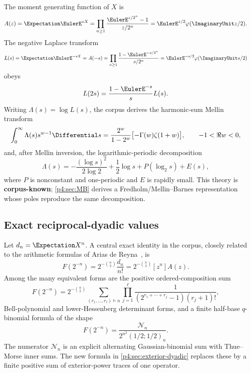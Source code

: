 \documentclass[11pt]{article}
\theoremstyle{definition}
\theoremstyle{remark}
\newcommand{\phiF}{\varphi}
\newcommand{\CorpusKnown}{\textcolor{linkblue}{\textbf{corpus-known}}}
\begin{document}
The moment generating function of \(X\) is
\begin{equation}
 A(z)=\Expectation\EulerE^{zX}
 =\prod_{n\ge1}\frac{\EulerE^{z/2^n}-1}{z/2^n}
 =\EulerE^{z/2}\phiF(\ImaginaryUnit z/2).
 \label{p4:eq:A-product}
\end{equation}
The negative Laplace transform
\begin{equation}
 L(s)=\Expectation\EulerE^{-sX}=A(-s)
 =\prod_{n\ge1}\frac{1-\EulerE^{-s/2^n}}{s/2^n}
 =\EulerE^{-s/2}\phiF(\ImaginaryUnit s/2)
 \label{p4:eq:L-product}
\end{equation}
obeys
\begin{equation}
 L(2s)=\frac{1-\EulerE^{-s}}{s}L(s).
 \label{p4:eq:L-scaling}
\end{equation}
Writing \(\Lambda(s)=\log L(s)\), the corpus derives the harmonic-sum Mellin transform
\begin{equation}
 \int_0^\infty \Lambda(s)s^{w-1}\Differential s
 =\frac{2^w}{1-2^w}\bigl[-\Gamma(w)\zeta(1+w)\bigr],
 \qquad -1<\Re w<0,
 \label{p4:eq:known-Mellin}
\end{equation}
and, after Mellin inversion, the logarithmic-periodic decomposition
\begin{equation}
 \Lambda(s)=-\frac{(\log s)^2}{2\log2}+\frac12\log s
 +P(\log_2s)+E(s),
 \label{p4:eq:endpoint-periodic}
\end{equation}
where \(P\) is nonconstant and one-periodic and \(E\) is rapidly small.  This theory is
\CorpusKnown{}; \cref{p4:sec:MB} derives a Fredholm/Mellin--Barnes representation whose
poles reproduce the same decomposition.

\subsection{Exact reciprocal-dyadic values}

Let \(d_n=\Expectation X^n\).  A central exact identity in the corpus, closely related to the arithmetic formulas of
Arias de Reyna~\cite{p4:Arias2018}, is
\begin{equation}
 \boxed{\quad
 F(2^{-n})=2^{-\binom n2}\frac{d_n}{n!}
 =2^{-\binom n2}[z^n]A(z).
 \quad}
 \label{p4:eq:dyadic-moment}
\end{equation}
Among the many equivalent forms are the positive ordered-composition sum
\begin{equation}
 F(2^{-n})=2^{-\binom n2}
 \sum_{(r_1,\ldots,r_\ell)\vDash n}
 \prod_{j=1}^{\ell}
 \frac1{(2^{r_1+\cdots+r_j}-1)(r_j+1)!},
 \label{p4:eq:ordered-composition}
\end{equation}
Bell-polynomial and lower-Hessenberg determinant forms, and a finite half-base
\(q\)-binomial formula of the shape
\begin{equation}
 F(2^{-n})=\frac{\mathcal N_n}{2^{n^2}(1/2;1/2)_n}.
 \label{p4:eq:q-shape}
\end{equation}
The numerator \(\mathcal N_n\) is an explicit alternating Gaussian-binomial sum with
Thue--Morse inner sums.  The new formula in \cref{p4:sec:exterior-dyadic} replaces these
by a finite positive sum of exterior-power traces of one operator.
\end{document}

